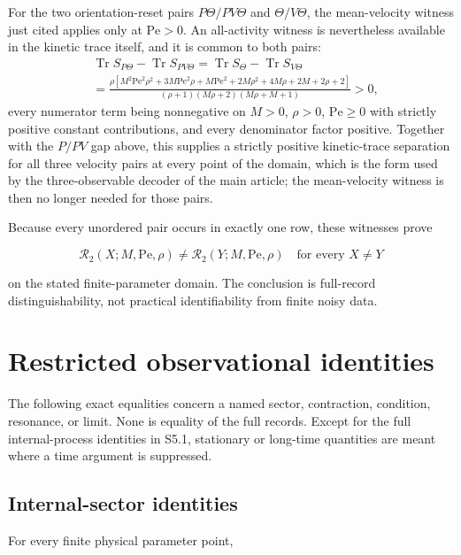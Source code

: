 For the two orientation-reset pairs $P\Theta/PV\Theta$ and $\Theta/V\Theta$, the mean-velocity witness just cited applies only at $\mathrm{Pe}>0$. An all-activity witness is nevertheless available in the kinetic trace itself, and it is common to both pairs:
\[
\begin{aligned}
&\operatorname{Tr}S_{P\Theta}-\operatorname{Tr}S_{PV\Theta}
=\operatorname{Tr}S_{\Theta}-\operatorname{Tr}S_{V\Theta}\\
&=\frac{\rho\left[
M^2\mathrm{Pe}^2\rho^2+3M\mathrm{Pe}^2\rho+M\mathrm{Pe}^2
+2M\rho^2+4M\rho+2M+2\rho+2\right]}
{(\rho+1)(M\rho+2)(M\rho+M+1)}
>0 ,
\end{aligned}
\]
every numerator term being nonnegative on $M>0$, $\rho>0$, $\mathrm{Pe}\ge0$ with strictly positive constant contributions, and every denominator factor positive. Together with the $P/PV$ gap above, this supplies a strictly positive kinetic-trace separation for all three velocity pairs at every point of the domain, which is the form used by the three-observable decoder of the main article; the mean-velocity witness is then no longer needed for those pairs.

Because every unordered pair occurs in exactly one row, these witnesses prove

\[
\boxed{
\mathcal R_2(X;M,\mathrm{Pe},\rho)
\ne
\mathcal R_2(Y;M,\mathrm{Pe},\rho)
\quad\text{for every }X\ne Y
}
\]

on the stated finite-parameter domain. The conclusion is full-record distinguishability, not practical identifiability from finite noisy data.



\section{Restricted observational identities}\label{s5.-restricted-identity-ledger}

The following exact equalities concern a named sector, contraction, condition, resonance, or limit. None is equality of the full records. Except for the full internal-process identities in S5.1, stationary or long-time quantities are meant where a time argument is suppressed.

\subsection{Internal-sector identities}\label{s5.1-internal-sector-identities}

For every finite physical parameter point,

